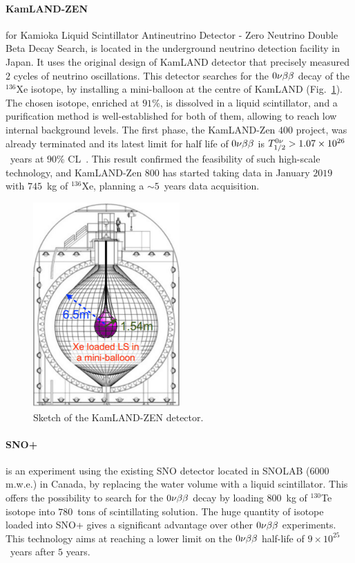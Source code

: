 \paragraph{KamLAND-ZEN} for Kamioka Liquid Scintillator Antineutrino Detector - Zero Neutrino Double Beta Decay Search, is located in the underground neutrino detection facility in Japan.
It uses the original design of KamLAND detector that precisely measured $2$ cycles of neutrino oscillations.
This detector searches for the $0\nu\beta\beta$ decay of the $^{136}$Xe isotope, by installing a mini-balloon at the centre of KamLAND (Fig.~\ref{fig:KamLAND}).
The chosen isotope, enriched at $91$\%, is dissolved in a liquid scintillator, and a purification method is well-established for both of them, allowing to reach low internal background levels.
The first phase, the KamLAND-Zen $400$ project, was already terminated and its latest limit for half life of $0\nu\beta\beta$ is $T_{1/2}^{0\nu}>1.07\times 10^{26}$~years at $90$\% CL~\cite{art:KamLAND2016}.
This result confirmed the feasibility of such high-scale technology, and KamLAND-Zen $800$ has started taking data in January $2019$ with $745$~kg of $^{136}$Xe, planning a $\sim 5$~years data acquisition.

\begin{figure}
  \centering
  \includegraphics[width=0.5\textwidth]{neutrinophysics/fig_neutrinophysics/KamLAND-ZEN.pdf}
  \caption{Sketch of the KamLAND-ZEN detector.
    \label{fig:KamLAND}}
\end{figure}

\paragraph{SNO+} is an experiment using the existing SNO detector located in SNOLAB ($6000$ m.w.e.) in Canada, by replacing the water volume with a liquid scintillator.
This offers the possibility to search for the $0\nu\beta\beta$ decay by loading $800$~kg of $^{130}$Te isotope into $780$~tons of scintillating solution.
The huge quantity of isotope loaded into SNO+ gives a significant advantage over other $0\nu\beta\beta$ experiments.
This technology aims at reaching a lower limit on the $0\nu\beta\beta$ half-life of $9 \times 10^{25}$~years after $5$ years.


